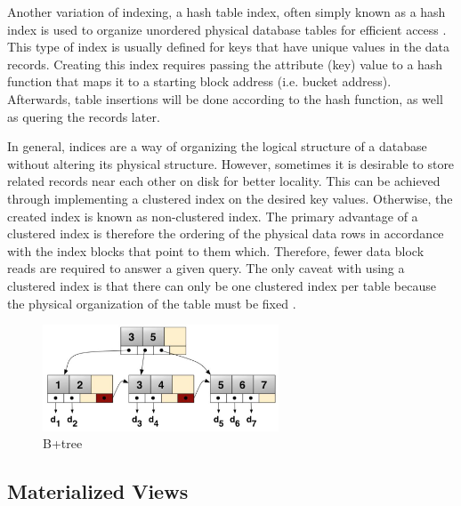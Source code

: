 \documentclass[12pt,a4paper]{article}
\begin{document}
Another variation of indexing, a hash table index, often simply known as a hash index is used to organize unordered physical database tables for efficient
access \cite{lightstone2007physical}. This type of index is usually defined for keys that have unique values in the data records. Creating this index requires
passing the attribute (key) value to a hash function that maps it to a starting block address (i.e. bucket address). Afterwards, table insertions will be done
according to the hash function, as well as quering the records later.

In general, indices are a way of organizing the logical structure of a database without altering its physical structure. However, sometimes it is desirable to
store related records near each other on disk for better locality. This can be achieved through implementing a clustered index on the desired key values.
Otherwise, the created index is known as non-clustered index. The primary advantage of a clustered index is therefore the ordering of the physical data rows in
accordance with the index blocks that point to them which. Therefore, fewer data block reads are required to answer a given query. The only caveat with using a
clustered index is that there can only be one clustered index per table because the physical organization of the table must be fixed
\cite{lightstone2007physical}.

\begin{figure}[!t]
\centering
\includegraphics[width=7cm]{figs/b+tree.png}
\caption{B+tree}
\label{fig:b+tree}
\end{figure}

\subsection{Materialized Views}
\end{document}
